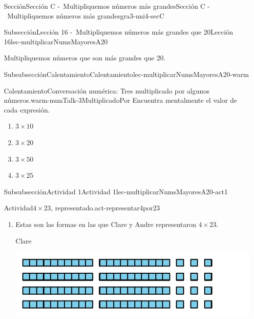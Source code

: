 \documentclass[twoside,10pt,]{article}
\begin{document}
\begin{sectionptx}{Sección}{Sección C -~Multipliquemos números más grandes}{}{Sección C -~Multipliquemos números más grandes}{}{}{gra3-uni4-secC}
%
%
\typeout{************************************************}
\typeout{************************************************}
%
\begin{subsectionptx}{Subsección}{Lección 16 -~Multipliquemos números más grandes que 20}{}{Lección 16}{}{}{lec-multiplicarNumsMayoresA20}
\begin{introduction}{}%
Multipliquemos números que son más grandes que 20.%
\end{introduction}%
%
%
\typeout{************************************************}
\typeout{************************************************}
%
\begin{subsubsectionptx}{Subsubsección}{Calentamiento}{}{Calentamiento}{}{}{lec-multiplicarNumsMayoresA20-warm}
\begin{exploration}{Calentamiento}{Conversación numérica: Tres multiplicado por algunos números.}{warm-numTalk-3MultiplicadoPor}%
Encuentra mentalmente el valor de cada expresión.%
%
\begin{enumerate}[label={\Alph*.}]
\item{}\(\displaystyle 3\times 10\)%
\item{}\(\displaystyle 3\times 20\)%
\item{}\(\displaystyle 3\times 50\)%
\item{}\(\displaystyle 3\times 25\)%
\end{enumerate}
\end{exploration}%
\end{subsubsectionptx}
%
%
\typeout{************************************************}
\typeout{************************************************}
%
\begin{subsubsectionptx}{Subsubsección}{Actividad 1}{}{Actividad 1}{}{}{lec-multiplicarNumsMayoresA20-act1}
\begin{activity}{Actividad}{\(4\times 23\), representado.}{act-representar4por23}%
%
\begin{enumerate}
\item{}Estas son las formas en las que Clare y Andre representaron \(4\times 23\).%
\begin{sidebyside}{2}{0}{0}{0}%
\begin{sbspanel}{0.5}%
Clare%
\par
\includegraphics[width=\linewidth]{external/svg-source/tikz-file-152969-scale13.pdf}

\end{sbspanel}
\end{sidebyside}
\end{enumerate}
\end{activity}
\end{subsubsectionptx}
\end{subsectionptx}
\end{sectionptx}
\end{document}
